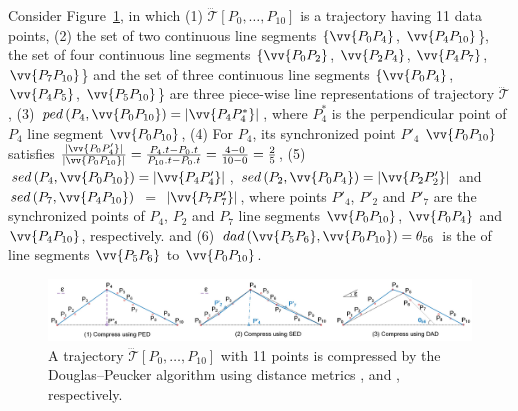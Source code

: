 \begin{example}
	\label{exm-notations}
	Consider {Figure}~\ref{fig:dp}, in which
	(1) $\dddot{\mathcal{T}}\left[P_0, \ldots, P_{10}\right]$ is a trajectory having 11 data points,
    (2) the set of two continuous line segments $\{\vv{P_0P_4}$, $\vv{P_4P_{10}}$\}, the set of four continuous line segments $\{\vv{P_0P_2}$, $\vv{P_2P_4}$, $\vv{P_4P_7}$, $\vv{P_7P_{10}}$\} and the set of three continuous line segments $\{\vv{P_0P_4}$, $\vv{P_4P_5}$, $\vv{P_5P_{10}}$\} are three piece-wise line representations of trajectory $\dddot{\mathcal{T}}$,
	(3) $ped\left(P_4, \vv{P_0P_{10}}\right)=|\vv{P_4P^*_4}|$, where $P^*_4$ is the perpendicular point of $P_4$ \wrt line segment $\vv{P_0P_{10}}$,
	(4) For $P_4$, its synchronized point $P'_4$ \wrt $\vv{P_0P_{10}}$ satisfies $\frac{|\vv{P_0P'_4}|}{|\vv{P_0P_{10}}|} = \frac{P_4.t - P_0.t}{P_{10}.t-P_0.t} = \frac{4-0}{10-0}= \frac{2}{5}$,
	(5) $sed\left(P_4, \vv{P_0P_{10}}\right)= |\vv{P_4P'_4}|$, $sed\left(P_2, \vv{P_0P_{4}}\right)= |\vv{P_2P'_2}|$ and $sed\left(P_7, \vv{P_4P_{10}}\right)$ $=$ $|\vv{P_7P'_7}|$,
	where points $P'_4$, $P'_2$ and $P'_7$ are the synchronized points of $P_4$, $P_2$ and $P_7$ \wrt line segments $\vv{P_0P_{10}}$, $\vv{P_0P_{4}}$ and $\vv{P_4P_{10}}$, respectively.  and
    (6) $dad\left(\vv{P_5P_6}, \vv{P_0P_{10}}\right)=\theta_{56}$ is the \dad of line segments $\vv{P_5P_6}$ to $\vv{P_0P_{10}}$.
\end{example}


\begin{figure}[tb!]
	\centering
	\includegraphics[scale=0.46]{Figures/Fig-DP.jpg}\vspace{-1ex}
	\caption{\small  A trajectory $\dddot{\mathcal{T}}[P_0, \ldots, P_{10}]$ with 11 points is compressed by the Douglas--Peucker algorithm \cite{Douglas:Peucker} using distance metrics \ped, \sed and \dad, respectively.}
		\vspace{-2ex}
	\label{fig:dp}
\end{figure}




